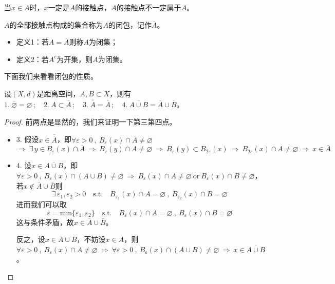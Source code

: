 当$x \in A$时，$x$一定是$A$的接触点，$A$的接触点不一定属于$A$。

\begin{definition}[闭包]
$A$的全部接触点构成的集合称为$A$的闭包，记作$\overline{A}$。
\end{definition}
\begin{definition}[闭集]
\begin{itemize}
\item 定义1：若$A=\overline{A}$则称$A$为闭集；
\item 定义2：若$A^c$为开集，则$A$为闭集。
\end{itemize}
\end{definition}

下面我们来看看闭包的性质。
\begin{theorem}
设$(X,d)$是距离空间，$A,B \subset X$，则有$1. \ \overline{\varnothing}=\varnothing \, ; \quad 2. \ A \subset \overline{A} \, ; \quad 3. \ \overline{\overline{A}}=\overline{A} \, ; \quad 4. \ \overline{A \cup B}=\overline{A} \cup \overline{B}$。
\end{theorem}
\begin{proof}前两点是显然的，我们来证明一下第三第四点。
\begin{itemize}
\item 3. 假设$x \in \overline{\overline{A}}$，即$\forall \varepsilon>0 \ , \ B_{\varepsilon}(x) \cap \overline{A} \neq \varnothing$
\[\Rightarrow \ \exists \, y \in B_{\varepsilon}(x) \cap \overline{A} \ \Rightarrow \ B_{\varepsilon}(y) \cap A \neq \varnothing \ \Rightarrow \ B_{\varepsilon}(y) \subset B_{2\varepsilon}(x) \ \Rightarrow \ B_{2\varepsilon}(x) \cap A \neq \varnothing \ \Rightarrow \ x \in \overline{A}\]
\item 4. 设$x \in \overline{A \cup B}$，即$\forall \varepsilon>0 \ , \ B_{\varepsilon}(x) \cap (A \cup B) \neq \varnothing \ \Rightarrow \ B_{\varepsilon}(x) \cap A \neq \varnothing \ \text{or} \ B_{\varepsilon}(x) \cap B \neq \varnothing$，若$x \notin \overline{A} \cup \overline{B}$则
\[\exists \, \varepsilon_1,\varepsilon_2>0 \quad \text{s.t.} \quad B_{\varepsilon_1}(x) \cap A=\varnothing \ , \ B_{\varepsilon_2}(x) \cap B=\varnothing\]
进而我们可以取
\[\varepsilon=\text{min}\{\varepsilon_1,\varepsilon_2\} \quad \text{s.t.} \quad B_{\varepsilon}(x) \cap A=\varnothing \ , \ B_{\varepsilon}(x) \cap B=\varnothing\]
这与条件矛盾，故$x \in \overline{A} \cup \overline{B}$。

反之，设$x \in \overline{A} \cup \overline{B}$，不妨设$x \in A$，则$\forall \varepsilon>0 \ , \ B_{\varepsilon}(x) \cap A \neq \varnothing \ \Rightarrow \ \forall \varepsilon>0 \ , \ B_{\varepsilon}(x) \cap (A \cup B) \neq \varnothing \ \Rightarrow  \ x \in \overline{A \cup B}$。
\end{itemize}
\end{proof}

